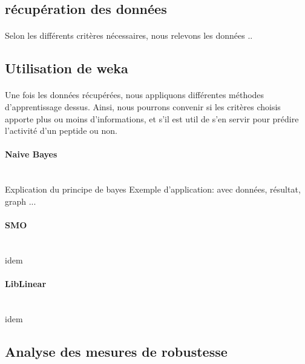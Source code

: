 \documentclass[a4paper,10pt]{report}
\begin{document}
	 
	 \subsection{récupération des données}
	 
	    \paragraph{} 
	    Selon les différents critères nécessaires, nous relevons les données .. 
	    
	    
	 \subsection{Utilisation de weka}
	 
	    \paragraph{}
	    
	    Une fois les données récupérées, nous appliquons différentes méthodes d'apprentissage dessus.
	    Ainsi, nous pourrons convenir si les critères choisis apporte plus ou moins d'informations, et s'il est util de s'en servir pour prédire l'activité d'un peptide ou non. 
	    

	    \paragraph{Naive Bayes}
	    
	    ~\\Explication du principe de bayes
	    Exemple d'application: avec données, résultat, graph ...
	    
	    
	    \paragraph{SMO}
	    
	    ~\\idem 
	    
	    \paragraph{LibLinear}
	   
	    ~\\idem
	   
	 \subsection{Analyse des mesures de robustesse}
\end{document}
